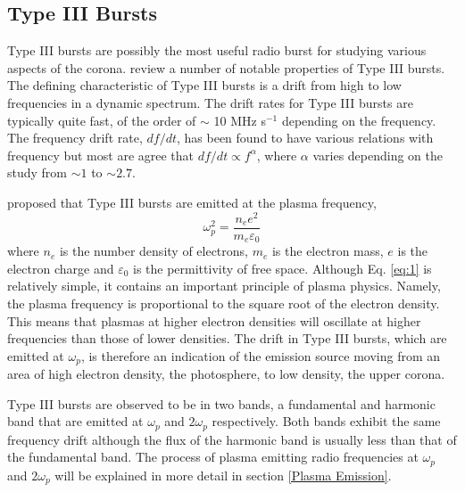 \subsection{Type III Bursts}
\label{characteristics} %
Type III bursts are possibly the most useful radio burst for studying various aspects of the corona.
\cite{Reid2014} review a number of notable properties of Type III bursts. The defining characteristic of Type III bursts is a drift from high to low frequencies in a dynamic spectrum. The drift rates for Type III bursts are typically quite fast, of the order of $\sim$ 10 MHz s$^{-1}$ depending on the frequency. The frequency drift rate, $df/dt$, has been found to have various relations with frequency \citep{Reid2014} but most are agree that $df/dt \propto f^{\alpha}$, where $\alpha$ varies depending on the study from $\sim 1$ to $\sim 2.7$. 

\cite{Ginzburg1958} proposed that Type III bursts are emitted at the plasma frequency,
\begin{equation}\label{eq:1}
    \omega_{p}^2 = \frac{n_ee^2}{m_e \varepsilon_0}
\end{equation}
where $n_e$ is the number density of electrons, $m_e$ is the electron mass, $e$ is the electron charge and $\varepsilon_0$ is the permittivity of free space.
Although Eq. \ref{eq:1} is relatively simple, it contains an important principle of plasma physics. Namely, the plasma frequency is proportional to the square root of the electron density. This means that plasmas at higher electron densities will oscillate at higher frequencies than those of lower densities. The drift in Type III bursts, which are emitted at $\omega_p$, is therefore an indication of the emission source moving from an area of high electron density, the photosphere, to low density, the upper corona.

Type III bursts are observed to be in two bands, a fundamental and harmonic band that are emitted at $\omega_p$ and $2 \omega_p$ respectively. Both bands exhibit the same frequency drift although the flux of the harmonic band is usually less than that of the fundamental band. The process of plasma emitting radio frequencies at $\omega_p$ and $2 \omega_p$ will be explained in more detail in section \ref{Plasma Emission}. 

